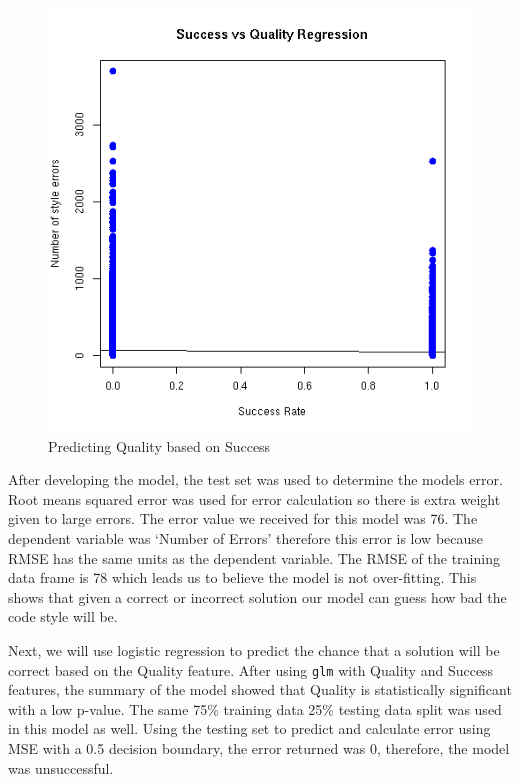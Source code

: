 \documentclass{article}
\begin{document}
\begin{figure}[ht] \vskip 0.2in \begin{center}
\centerline{\includegraphics[width=\columnwidth]{../images/linearregression.png}}
\caption{ Predicting Quality based on Success } \label{linearRegression} \end{center} \vskip -0.2in \end{figure}

After developing the model, the test set was used to determine the
models error. Root means squared error was used for error calculation so
there is extra weight given to large errors. The error value we received
for this model was 76. The dependent variable was `Number of Errors'
therefore this error is low because RMSE has the same units as the
dependent variable. The RMSE of the training data frame is 78 which
leads us to believe the model is not over-fitting. This shows that given
a correct or incorrect solution our model can guess how bad the code
style will be.

Next, we will use logistic regression to predict the chance that a
solution will be correct based on the Quality feature. After using
\texttt{glm} with Quality and Success features, the summary of the model
showed that Quality is statistically significant with a low p-value. The
same 75\% training data 25\% testing data split was used in this model
as well. Using the testing set to predict and calculate error using MSE
with a 0.5 decision boundary, the error returned was 0, therefore, the
model was unsuccessful.
\end{document}
